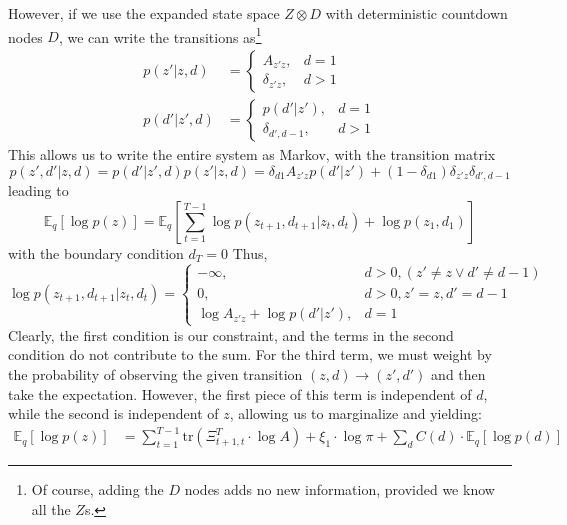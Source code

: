 \documentclass[11pt]{article}
\begin{document}
However, if we use the expanded state space $Z \otimes D$ with deterministic countdown nodes $D$, we can write the transitions as\footnote{Of course, adding the $D$ nodes adds no new information, provided we know all the $Z$s.}
\begin{align}
    p(z'|z, d) &=
        \begin{cases}
            A_{z'z}, & d=1 \\
            \delta_{z'z}, & d > 1
        \end{cases} \\
    p(d'|z', d) &=
        \begin{cases}
            p(d'|z'), & d=1 \\
            \delta_{d', d - 1}, & d > 1
        \end{cases}
\end{align}
This allows us to write the entire system as Markov, with the transition matrix
\begin{equation}
    p(z', d'|z, d) = p(d'|z', d) p(z'|z, d) =
    \delta_{d1} A_{z'z}p(d'|z') + (1 - \delta_{d1}) \delta_{z'z} \delta_{d', d-1}
\end{equation}
leading to
\begin{equation}
    \mathbb{E}_q[\log p(z)] = \mathbb{E}_q\left[
    \sum_{t = 1}^{T - 1} \log p(z_{t + 1}, d_{t + 1}|z_t, d_t) +
    \log p(z_1, d_1)
    \right]
\end{equation}
with the boundary condition $d_T = 0$ Thus,
\begin{equation}
    \log p(z_{t + 1}, d_{t + 1}|z_t, d_t) =
    \begin{cases}
        -\infty, & d > 0, (z'\neq z \vee d' \neq d - 1) \\
        0, & d > 0, z' = z, d' = d - 1 \\
        \log A_{z'z} + \log p(d'|z'), & d = 1
    \end{cases}
\end{equation}
Clearly, the first condition is our constraint, and the terms in the second condition do not contribute to the sum. For the third term, we must weight by the probability of observing the given transition $(z, d) \rightarrow (z', d')$ and then take the expectation. However, the first piece of this term is independent of $d$, while the second is independent of $z$, allowing us to marginalize and yielding:
\begin{align}
    \mathbb{E}_q[\log p(z)] &= \sum_{t = 1}^{T - 1}
    \mathrm{tr}(\Xi_{t+1, t}^T \cdot \log A) + \xi_1 \cdot \log \pi + \sum_d C(d) \cdot \mathbb{E}_q[\log p(d)]
\end{align}
\end{document}
